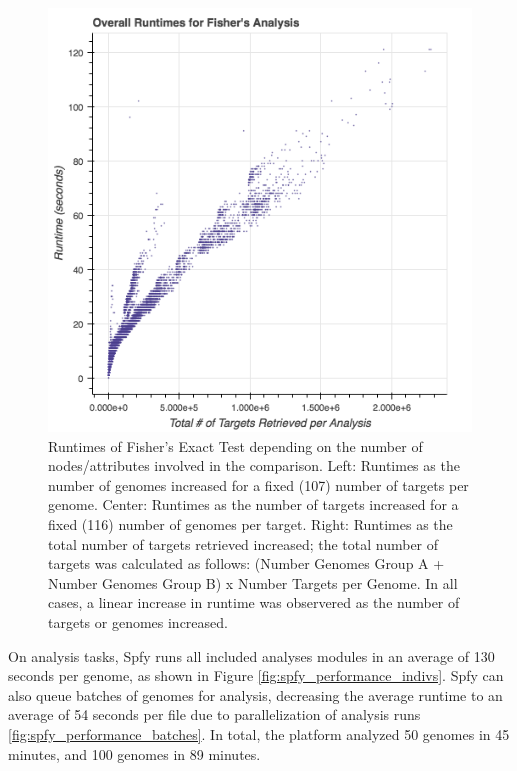 \documentclass{article}
\begin{document}
\begin{figure}[!htb]
\endminipage\hfill
{}%
  \includegraphics[width=\linewidth]{images/fishers_overall.png}
\endminipage
\caption{Runtimes of Fisher's Exact Test depending on the number of nodes/attributes involved in the comparison. Left: Runtimes as the number of genomes increased for a fixed (107) number of targets per genome. Center: Runtimes as the number of targets increased for a fixed (116) number of genomes per target. Right: Runtimes as the total number of targets retrieved increased; the total number of targets was calculated as follows: (Number Genomes Group A + Number Genomes Group B) x Number Targets per Genome. In all cases, a linear increase in runtime was observered as the number of targets or genomes increased.}\label{fig:fishers_performance}
\end{figure}

On analysis tasks, Spfy runs all included analyses modules in an average of 130 seconds per genome, as shown in Figure \ref{fig:spfy_performance_indivs}.
Spfy can also queue batches of genomes for analysis, decreasing the average runtime to an average of 54 seconds per file due to parallelization of analysis runs \ref{fig:spfy_performance_batches}.
In total, the platform analyzed 50 genomes in 45 minutes, and 100 genomes in 89 minutes.

\end{document}
